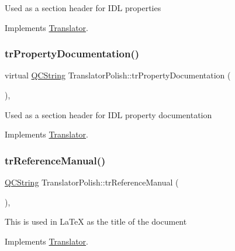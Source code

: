 Used as a section header for I\+DL properties 

Implements \mbox{\hyperlink{class_translator}{Translator}}.

\mbox{\label{class_translator_polish_ab646ef6a01416499a16c0324f0174638}} 
\subsubsection{\texorpdfstring{trPropertyDocumentation()}{trPropertyDocumentation()}}
{\footnotesize\ttfamily virtual \mbox{\hyperlink{class_q_c_string}{Q\+C\+String}} Translator\+Polish\+::tr\+Property\+Documentation (\begin{DoxyParamCaption}{ }\end{DoxyParamCaption})\hspace{0.3cm}{\ttfamily [inline]}, {\ttfamily [virtual]}}

Used as a section header for I\+DL property documentation 

Implements \mbox{\hyperlink{class_translator}{Translator}}.

\mbox{\label{class_translator_polish_afc39e687267da214628ca4c2616e96a1}} 
\subsubsection{\texorpdfstring{trReferenceManual()}{trReferenceManual()}}
{\footnotesize\ttfamily \mbox{\hyperlink{class_q_c_string}{Q\+C\+String}} Translator\+Polish\+::tr\+Reference\+Manual (\begin{DoxyParamCaption}{ }\end{DoxyParamCaption})\hspace{0.3cm}{\ttfamily [inline]}, {\ttfamily [virtual]}}

This is used in La\+TeX as the title of the document 

Implements \mbox{\hyperlink{class_translator}{Translator}}.

\mbox{\label{class_translator_polish_ac65e96984474e5afde06e8df1dae5762}} 
